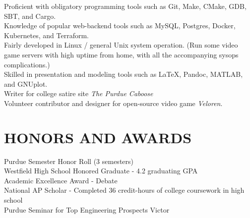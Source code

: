 \documentclass[10pt]{res}
\begin{document}
\begin{resume}
	Proficient with obligatory programming tools such as Git, Make, CMake, GDB, SBT, and Cargo. \\
  Knowledge of popular web-backend tools such as MySQL, Postgres, Docker, Kubernetes, and Terraform.\\
	Fairly developed in Linux / general Unix system operation. (Run some video game servers with high uptime from home, with all the accompanying sysops complications.)\\
	Skilled in presentation and modeling tools such as \LaTeX, Pandoc, MATLAB, and GNUplot. \\
	Writer for college satire site \emph{The Purdue Caboose} \\
	Volunteer contributor and designer for open-source video game \emph{Veloren}.
 
\vspace{-10pt}\section{HONORS AND AWARDS}          
  Purdue Semester Honor Roll (3 semesters) \\
	Westfield High School Honored Graduate - 4.2 graduating GPA \\
	Academic Excellence Award - Debate \\
	National AP Scholar - Completed 36 credit-hours of college coursework in high school \\
  Purdue Seminar for Top Engineering Prospects Victor \\

\end{resume}
\end{document}
